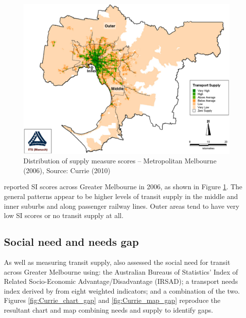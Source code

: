 \documentclass[preprint, 3p,
authoryear]{elsarticle} %
\begin{document}
\begin{figure}
\includegraphics[width=1\linewidth]{graphics/Currie2010SI} \caption{Distribution of supply measure scores – Metropolitan Melbourne (2006), Source: Currie (2010)}\label{fig:Currie_map_SI}
\end{figure}

\citet{currie2010identifying} reported SI scores across Greater
Melbourne in 2006, as shown in Figure \ref{fig:Currie_map_SI}. The
general patterns appear to be higher levels of transit supply in the
middle and inner suburbs and along passenger railway lines. Outer areas
tend to have very low SI scores or no transit supply at all.

\hypertarget{social-need-and-needs-gap}{%
\subsection{Social need and needs gap}\label{social-need-and-needs-gap}}

As well as measuring transit supply, \citet{currie2010identifying} also
assessed the social need for transit across Greater Melbourne using: the
Australian Bureaus of Statistics' Index of Related Socio-Economic
Advantage/Disadvantage (IRSAD); a transport needs index derived by
\citet{currie2010identifying} from eight weighted indicators; and a
combination of the two. Figures \ref{fig:Currie_chart_gap} and
\ref{fig:Currie_map_gap} reproduce the resultant chart and map combining
needs and supply to identify gaps.
\end{document}
